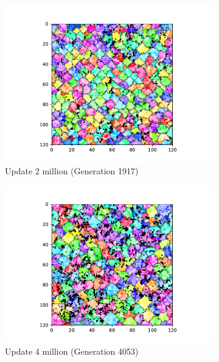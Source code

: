 \begin{figure}[!htbp]
\begin{center}
\begin{subfigure}[b]{0.5\columnwidth}
  \includegraphics[width=\columnwidth,trim={2.5cm 0.5cm 2.5cm 1cm},clip]{img/ChannelMap_1011_update2000000}
  \caption{Update 2 million (Generation 1917)}
  \label{fig:ChannelMap_1011_update2000000}
\end{subfigure}%
\begin{subfigure}[b]{0.5\columnwidth}
  \includegraphics[width=\columnwidth,trim={2.5cm 0.5cm 2.5cm 1cm},clip]{img/ChannelMap_1011_update4000000}
  \caption{Update 4 million (Generation 4053)}
  \label{fig:ChannelMap_1011_update4000000}
\end{subfigure}
\begin{subfigure}[b]{0.5\columnwidth}

\end{subfigure}
\end{center}
\end{figure}
